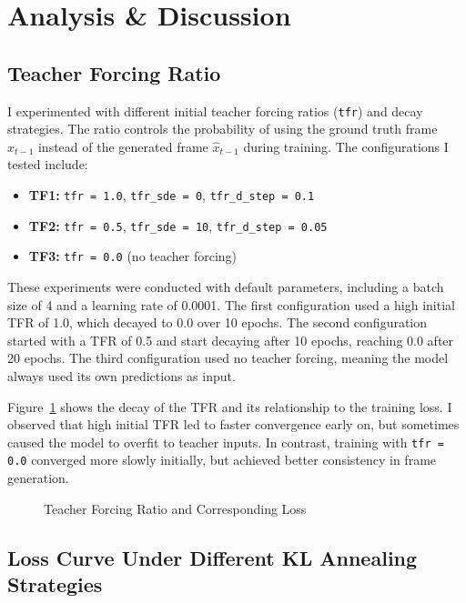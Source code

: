 \section{Analysis \& Discussion}

\subsection{Teacher Forcing Ratio}
I experimented with different initial teacher forcing ratios (\texttt{tfr}) and decay strategies. The ratio controls the probability of using the ground truth frame $x_{t-1}$ instead of the generated frame $\hat{x}_{t-1}$ during training. The configurations I tested include:

\begin{itemize}
    \item \textbf{TF1:} \texttt{tfr = 1.0}, \texttt{tfr\_sde = 0}, \texttt{tfr\_d\_step = 0.1}
    \item \textbf{TF2:} \texttt{tfr = 0.5}, \texttt{tfr\_sde = 10}, \texttt{tfr\_d\_step = 0.05}
    \item \textbf{TF3:} \texttt{tfr = 0.0} (no teacher forcing)
\end{itemize}

These experiments were conducted with default parameters, including a batch size of 4 and a learning rate of 0.0001.
The first configuration used a high initial TFR of 1.0, which decayed to 0.0 over 10 epochs.
The second configuration started with a TFR of 0.5 and start decaying after 10 epochs, reaching 0.0 after 20 epochs.
The third configuration used no teacher forcing, meaning the model always used its own predictions as input.

Figure~\ref{fig:tfr_vs_loss} shows the decay of the TFR and its relationship to the training loss. I observed that high initial TFR led to faster convergence early on, but sometimes caused the model to overfit to teacher inputs. In contrast, training with \texttt{tfr = 0.0} converged more slowly initially, but achieved better consistency in frame generation.

\begin{figure}[H]
    \centering
    
    \caption{Teacher Forcing Ratio and Corresponding Loss}
    \label{fig:tfr_vs_loss}
\end{figure}

\subsection{Loss Curve Under Different KL Annealing Strategies}

